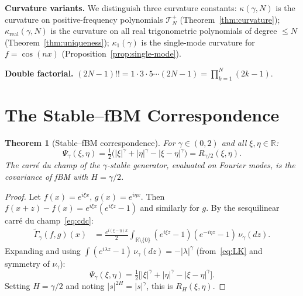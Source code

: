 \documentclass[11pt,a4paper]{article}
\theoremstyle{plain}
\newtheorem{theorem}{Theorem}[section]
\theoremstyle{definition}
\theoremstyle{remark}
\newcommand{\R}{\mathbb{R}}
\begin{document}
\medskip\noindent\textbf{Curvature variants.}
We distinguish three curvature constants:
$\kappa(\gamma,N)$ is the curvature on positive-frequency polynomials
$\mathcal{T}_N^+$ (Theorem~\ref{thm:curvature});
$\kappa_{\mathrm{real}}(\gamma,N)$ is the curvature on all real
trigonometric polynomials of degree $\leq N$ (Theorem~\ref{thm:uniqueness});
$\kappa_1(\gamma)$ is the single-mode curvature for $f = \cos(nx)$
(Proposition~\ref{prop:single-mode}).

\medskip\noindent\textbf{Double factorial.}
$(2N-1)!! = 1 \cdot 3 \cdot 5 \cdots (2N-1) = \prod_{k=1}^N (2k-1)$.


\section{The Stable--fBM Correspondence}\label{sec:duality}

\begin{theorem}[Stable--fBM correspondence]\label{thm:duality}
For $\gamma \in (0,2)$ and all $\xi, \eta \in \R$:
\begin{equation}\label{eq:duality}
  \Psi_\gamma(\xi,\eta)
  = \tfrac{1}{2}\bigl(|\xi|^\gamma + |\eta|^\gamma
  - |\xi - \eta|^\gamma\bigr)
  = R_{\gamma/2}(\xi, \eta).
\end{equation}
The carr\'e du champ of the $\gamma$-stable generator, evaluated
on Fourier modes, is the covariance of fBM with $H = \gamma/2$.
\end{theorem}

\begin{proof}
Let $f(x) = e^{i\xi x}$, $g(x) = e^{i\eta x}$.
Then $f(x+z) - f(x) = e^{i\xi x}(e^{i\xi z} - 1)$ and similarly
for $g$. By the sesquilinear carr\'e du champ~\eqref{eq:cdc}:
\begin{align*}
  \widetilde\Gamma_\gamma(f,g)(x)
  &= \frac{e^{i(\xi-\eta)x}}{2}\int_{\R \setminus \{0\}}
     (e^{i\xi z} - 1)(e^{-i\eta z} - 1)\,\nu_\gamma(dz).
\end{align*}
Expanding and using $\int (e^{i\lambda z} - 1)\,\nu_\gamma(dz)
= -|\lambda|^\gamma$ (from~\eqref{eq:LK} and symmetry of $\nu_\gamma$):
\[
  \Psi_\gamma(\xi,\eta)
  = \tfrac{1}{2}\bigl[|\xi|^\gamma + |\eta|^\gamma
  - |\xi - \eta|^\gamma\bigr].
\]
Setting $H = \gamma/2$ and noting $|s|^{2H} = |s|^\gamma$,
this is $R_H(\xi, \eta)$.
\end{proof}
\end{document}
